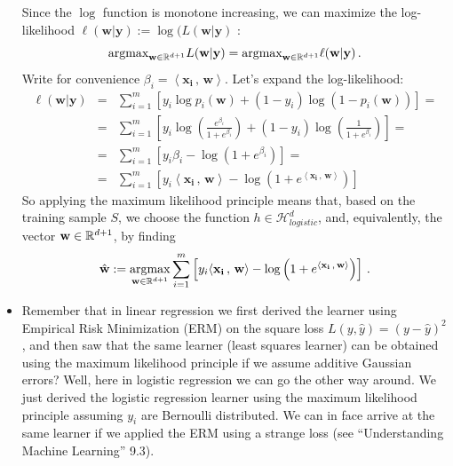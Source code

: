 \documentclass[11pt]{article}
\newcommand{\Hc}{\mathcal{H}}
\newcommand{\innerr}[2]{{\left\langle #1\,,\,#2 \right\rangle}}
\newcommand{\VV}[1]{\mathbf{#1}}
\begin{document}
\begin{itemize}
      Since the $\log$ function is monotone increasing, we can maximize the
      log-likelihood $\ell(\VV{w} | \VV{y}) := \log( L(\VV{w} | \VV{y})$ :
      \[
	\text{argmax}_{\VV{w}\in\reals^{d+1}} L(\VV{w} | \VV{y})  = 
	\text{argmax}_{\VV{w}\in\reals^{d+1}} \ell(\VV{w} | \VV{y})\,.
      \]
      Write for convenience $\beta_i = \innerr{\VV{x_i}}{\VV{w}}$. Let's expand
      the log-likelihood:
      \begin{eqnarray*}
	\ell(\VV{w} | \VV{y}) & = & \sum_{i=1}^m \left[ y_i \log p_i(\VV{w}) +
	(1-y_i)\log(1-p_i(\VV{w})) \right] = \\
	&=& \sum_{i=1}^m \left[ y_i \log \left(\frac{e^{\beta_i}}{1+e^{\beta_i}}\right)
	+(1-y_i) \log \left(\frac{1}{1+e^{\beta_i}}\right) \right] = \\
      &=& \sum_{i=1}^m \left[ y_i \beta_i - \log
      \left(1+e^{\beta_i}\right)\right] = \\
    &=& \sum_{i=1}^m \left[y_i \innerr{\VV{x_i}}{\VV{w}} - \log
    \left(1+e^{\innerr{\VV{x_i}}{\VV{w}}}\right) \right]
      \end{eqnarray*}
      So applying the maximum likelihood principle means that, based on the
      training sample
      $S$, we choose the function  $h\in \Hc_{logistic}^d$, and, equivalently, the vector 
      $\VV{w}\in\reals^{d+1}$, by finding
    \[
      \hat{\VV{w}} := 
      \argmax_{\VV{w}\in\reals^{d+1}}  
      \sum_{i=1}^m \left[ y_i \innerr{\VV{x_i}}{\VV{w}} - \log
      \left(1+e^{\innerr{\VV{x_i}}{\VV{w}}}\right) \right]\,.
    \]
  \item Remember that in linear regression we first derived the learner using
    Empirical Risk Minimization (ERM) on the square loss
    $L(y,\hat{y})=(y-\hat{y})^2$, and then saw that the
    same learner (least squares learner) 
    can be obtained using the maximum likelihood principle if we assume additive Gaussian
    errors? Well, here in logistic regression we can go the other way around.
    We just derived the logistic regression learner using the maximum likelihood
    principle assuming $y_i$ are Bernoulli distributed. We can in face arrive at
    the same learner if we applied the ERM using a strange
    loss (see ``Understanding Machine Learning'' 9.3).
  \end{itemize}
\end{document}
